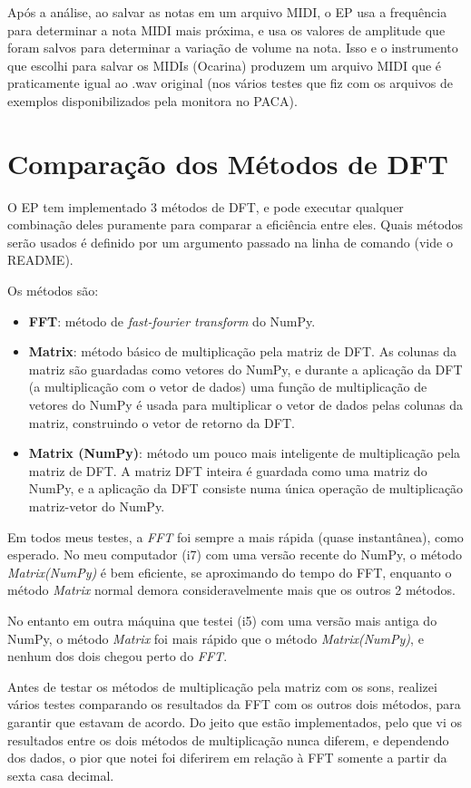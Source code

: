 \documentclass[a4paper,11pt]{article}
\begin{document}
Após a análise, ao salvar as notas em um arquivo MIDI, o EP usa a frequência para determinar a nota MIDI mais próxima, e usa
os valores de amplitude que foram salvos para determinar a variação de volume na nota. Isso e o instrumento que escolhi para
salvar os MIDIs (Ocarina) produzem um arquivo MIDI que é praticamente igual ao .wav original (nos vários testes que fiz com 
os arquivos de exemplos disponibilizados pela monitora no PACA).

\section{Comparação dos Métodos de DFT}

O EP tem implementado 3 métodos de DFT, e pode executar qualquer combinação deles puramente para comparar a eficiência entre
eles. Quais métodos serão usados é definido por um argumento passado na linha de comando (vide o README).

Os métodos são:
\begin{itemize}
  \item \textbf{FFT}: método de \textit{fast-fourier transform} do NumPy.
  \item \textbf{Matrix}: método básico de multiplicação pela matriz de DFT. As colunas da matriz são guardadas como vetores do
  NumPy, e durante a aplicação da DFT (a multiplicação com o vetor de dados) uma função de multiplicação de vetores do NumPy é 
  usada para multiplicar o vetor de dados pelas colunas da matriz, construindo o vetor de retorno da DFT.
  \item \textbf{Matrix (NumPy)}: método um pouco mais inteligente de multiplicação pela matriz de DFT. A matriz DFT inteira é
  guardada como uma matriz do NumPy, e a aplicação da DFT consiste numa única operação de multiplicação matriz-vetor do NumPy.
\end{itemize}

Em todos meus testes, a \textit{FFT} foi sempre a mais rápida (quase instantânea), como esperado. No meu computador (i7) com uma versão
recente do NumPy, o método \textit{Matrix(NumPy)} é bem eficiente, se aproximando do tempo do FFT, enquanto o método \textit{Matrix}
normal demora consideravelmente mais que os outros 2 métodos.

No entanto em outra máquina que testei (i5) com uma versão mais antiga do NumPy, o método \textit{Matrix} foi mais rápido que o
método \textit{Matrix(NumPy)}, e nenhum dos dois chegou perto do \textit{FFT}.

Antes de testar os métodos de multiplicação pela matriz com os sons, realizei vários testes comparando os resultados da FFT com
os outros dois métodos, para garantir que estavam de acordo. Do jeito que estão implementados, pelo que vi os resultados entre os
dois métodos de multiplicação nunca diferem, e dependendo dos dados, o pior que notei foi diferirem em relação à FFT somente a
partir da sexta casa decimal.
\end{document}
